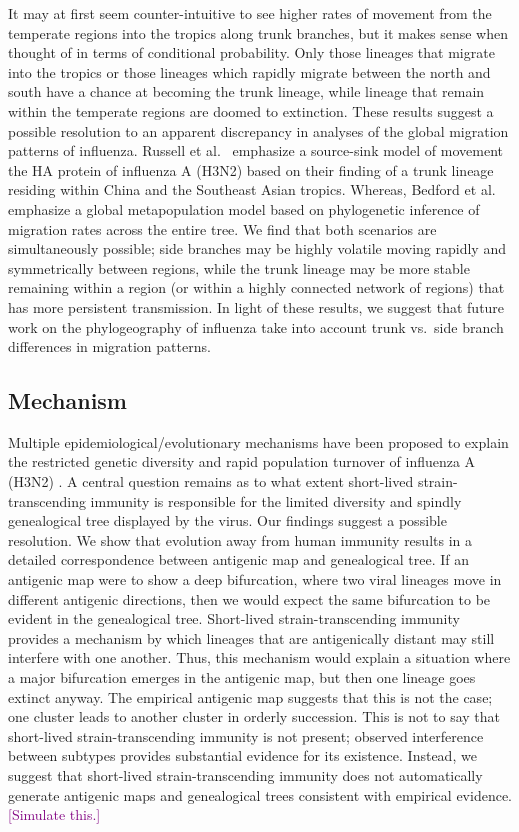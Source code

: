 \documentclass[11pt,oneside,letterpaper]{article}
\def\tbc#1{\textcolor{purple}{[#1]}}
\begin{document}
It may at first seem counter-intuitive to see higher rates of movement from the temperate regions into the tropics along trunk branches, but it makes sense when thought of in terms of conditional probability.  Only those lineages that migrate into the tropics or those lineages which rapidly migrate between the north and south have a chance at becoming the trunk lineage, while lineage that remain within the temperate regions are doomed to extinction.  These results suggest a possible resolution to an apparent discrepancy in analyses of the global migration patterns of influenza.  Russell et al.\ \cite{Russell08} emphasize a source-sink model of movement the HA protein of influenza A (H3N2) based on their finding of a trunk lineage residing within China and the Southeast Asian tropics.  Whereas, Bedford et al.\ \cite{Bedford10} emphasize a global metapopulation model based on phylogenetic inference of migration rates across the entire tree.  We find that both scenarios are simultaneously possible; side branches may be highly volatile moving rapidly and symmetrically between regions, while the trunk lineage may be more stable remaining within a region (or within a highly connected network of regions) that has more persistent transmission.  In light of these results, we suggest that future work on the phylogeography of influenza take into account trunk vs.\ side branch differences in migration patterns.

\subsection*{Mechanism}

Multiple epidemiological/evolutionary mechanisms have been proposed to explain the restricted genetic diversity and rapid population turnover of influenza A (H3N2) \cite{Ferguson03,Tria05,Koelle06,Recker07}.  A central question remains as to what extent short-lived strain-transcending immunity is responsible for the limited diversity and spindly genealogical tree displayed by the virus.  Our findings suggest a possible resolution.  We show that evolution away from human immunity results in a detailed correspondence between antigenic map and genealogical tree.  If an antigenic map were to show a deep bifurcation, where two viral lineages move in different antigenic directions, then we would expect the same bifurcation to be evident in the genealogical tree.  Short-lived strain-transcending immunity provides a mechanism by which lineages that are antigenically distant may still interfere with one another.  Thus, this mechanism would explain a situation where a major bifurcation emerges in the antigenic map, but then one lineage goes extinct anyway.  The empirical antigenic map \cite{Smith04} suggests that this is not the case; one cluster leads to another cluster in orderly succession.  This is not to say that short-lived strain-transcending immunity is not present; observed interference between subtypes \cite{Ferguson03,Goldstein11} provides substantial evidence for its existence.  Instead, we suggest that short-lived strain-transcending immunity does not automatically generate antigenic maps and genealogical trees consistent with empirical evidence.  \tbc{Simulate this.}
\end{document}
